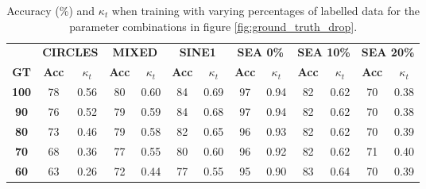 \begin{table}[]
  \centering
  \caption{Accuracy (\%) and $\kappa_t$ when training with varying percentages of labelled data for the parameter combinations in figure \ref{fig:ground_truth_drop}.
  \label{table:ground_truth_Acc_kappa}}
  \begin{tabular}{|c||c|c|c|c|c|c|c|c|c|c|c|c|}
  \hline
   & \multicolumn{2}{c|}{\textbf{CIRCLES}} & \multicolumn{2}{c|}{\textbf{MIXED}} & \multicolumn{2}{c|}{\textbf{SINE1}} & \multicolumn{2}{c|}{\textbf{SEA 0\%}} & \multicolumn{2}{c|}{\textbf{SEA 10\%}} & \multicolumn{2}{c|}{\textbf{SEA 20\%}} \\ \cline{2-13} 
\multirow{-2}{*}{\textbf{GT}} & \multicolumn{1}{c|}{\textbf{Acc}} & \multicolumn{1}{c|}{\textbf{$\kappa_t$}} & \multicolumn{1}{c|}{\textbf{Acc}} & \multicolumn{1}{c|}{\textbf{$\kappa_t$}} & \multicolumn{1}{c|}{\textbf{Acc}} & \multicolumn{1}{c|}{\textbf{$\kappa_t$}} & \multicolumn{1}{c|}{\textbf{Acc}} & \multicolumn{1}{c|}{\textbf{$\kappa_t$}} & \multicolumn{1}{c|}{\textbf{Acc}} & \multicolumn{1}{c|}{\textbf{$\kappa_t$}} & \multicolumn{1}{c|}{\textbf{Acc}} & \multicolumn{1}{c|}{\textbf{$\kappa_t$}} \\ \hhline{=============}
  \textbf{100} & {\color[HTML]{656565} 78} & 0.56 & {\color[HTML]{656565} 80} & 0.60 & {\color[HTML]{656565} 84} & 0.69 & {\color[HTML]{656565} 97} & 0.94 & {\color[HTML]{656565} 82} & 0.62 & {\color[HTML]{656565} 70} & 0.38 \\ \hline
  \textbf{90} & {\color[HTML]{656565} 76} & 0.52 & {\color[HTML]{656565} 79} & 0.59 & {\color[HTML]{656565} 84} & 0.68 & {\color[HTML]{656565} 97} & 0.94 & {\color[HTML]{656565} 82} & 0.62 & {\color[HTML]{656565} 70} & 0.38 \\ \hline
  \textbf{80} & {\color[HTML]{656565} 73} & 0.46 & {\color[HTML]{656565} 79} & 0.58 & {\color[HTML]{656565} 82} & 0.65 & {\color[HTML]{656565} 96} & 0.93 & {\color[HTML]{656565} 82} & 0.62 & {\color[HTML]{656565} 70} & 0.39 \\ \hline
  \textbf{70} & {\color[HTML]{656565} 68} & 0.36 & {\color[HTML]{656565} 77} & 0.55 & {\color[HTML]{656565} 80} & 0.60 & {\color[HTML]{656565} 96} & 0.92 & {\color[HTML]{656565} 82} & 0.62 & {\color[HTML]{656565} 71} & 0.40 \\ \hline
  \textbf{60} & {\color[HTML]{656565} 63} & 0.26 & {\color[HTML]{656565} 72} & 0.44 & {\color[HTML]{656565} 77} & 0.55 & {\color[HTML]{656565} 95} & 0.90 & {\color[HTML]{656565} 83} & 0.64 & {\color[HTML]{656565} 70} & 0.39 \\ \hline
  \end{tabular}
  \end{table}

